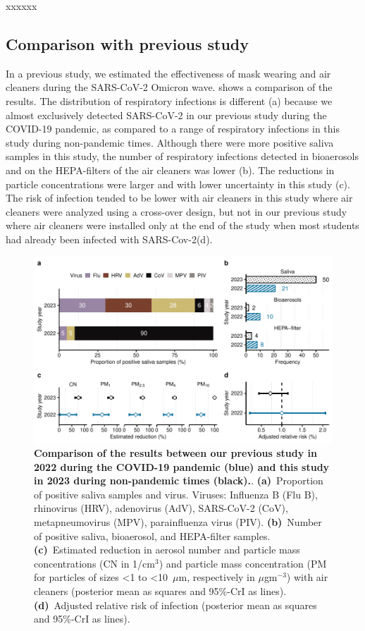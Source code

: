 \documentclass[fleqn,11pt]{wlscirep}
\begin{document}
xxxxxx

\subsection{Comparison with previous study}

In a previous study\cite{Banholzer2023PLoSMed}, we estimated the effectiveness of mask wearing and air cleaners during the SARS-CoV-2 Omicron wave.  shows a comparison of the results. The distribution of respiratory infections is different (a) because we almost exclusively detected SARS-CoV-2 in our previous study during the COVID-19 pandemic, as compared to a range of respiratory infections in this study during non-pandemic times. Although there were more positive saliva samples in this study, the number of respiratory infections detected in bioaerosols and on the HEPA-filters of the air cleaners was lower (b).
The reductions in particle concentrations were larger and with lower uncertainty in this study (c). The risk of infection tended to be lower with air cleaners in this study where air cleaners were analyzed using a cross-over design, but not in our previous study where air cleaners were installed only at the end of the study when most students had already been infected with SARS-Cov-2(d).

\begin{figure}[!htpb]
    \includegraphics[width=\linewidth]{../../results/comparison.pdf} 
    \caption{\textbf{Comparison of the results between our previous study in 2022 during the COVID-19 pandemic (blue) and this study in 2023 during non-pandemic times (black).}. \textbf{(a)}~Proportion of positive saliva samples and virus. Viruses: Influenza B (Flu B), rhinovirus (HRV), adenovirus (AdV), SARS-CoV-2 (CoV), metapneumovirus (MPV), parainfluenza virus (PIV). \textbf{(b)}~Number of positive saliva, bioaerosol, and HEPA-filter samples. \textbf{(c)}~Estimated reduction in aerosol number and particle mass concentrations (CN in 1/cm$^3$) and particle mass concentration (PM for particles of sizes <1 to <10~$\mu$m, respectively in $\mu$gm$^{-3}$) with air cleaners (posterior mean as squares and 95\%-CrI as lines). \textbf{(d)}~Adjusted relative risk of infection (posterior mean as squares and 95\%-CrI as lines).}
    \label{fig:comparison}
\end{figure}
\end{document}
